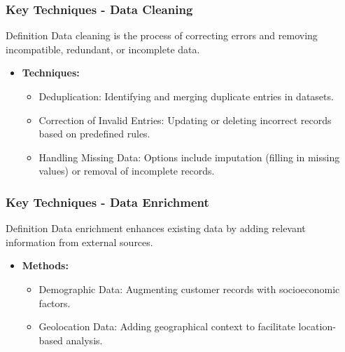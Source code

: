 \documentclass{beamer}
\begin{document}
\begin{frame}[fragile]
    \frametitle{Key Techniques - Data Cleaning}
    \begin{block}{Definition}
        Data cleaning is the process of correcting errors and removing incompatible, redundant, or incomplete data.
    \end{block}

    \begin{itemize}
        \item \textbf{Techniques:}
        \begin{itemize}
            \item Deduplication: Identifying and merging duplicate entries in datasets.
            \item Correction of Invalid Entries: Updating or deleting incorrect records based on predefined rules.
            \item Handling Missing Data: Options include imputation (filling in missing values) or removal of incomplete records.
        \end{itemize}
    \end{itemize}
\end{frame}

\begin{frame}[fragile]
    \frametitle{Key Techniques - Data Enrichment}
    \begin{block}{Definition}
        Data enrichment enhances existing data by adding relevant information from external sources.
    \end{block}

    \begin{itemize}
        \item \textbf{Methods:}
        \begin{itemize}
            \item Demographic Data: Augmenting customer records with socioeconomic factors.
            \item Geolocation Data: Adding geographical context to facilitate location-based analysis.
        \end{itemize}
    \end{itemize}
\end{frame}
\end{document}
